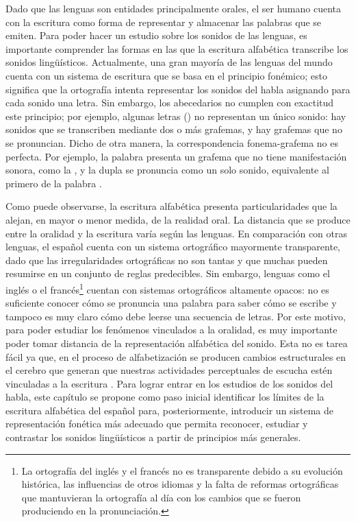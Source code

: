 Dado que las lenguas son entidades principalmente orales, el ser humano cuenta
con la escritura como forma de representar y almacenar las palabras que se
emiten. Para poder hacer un estudio sobre los sonidos de las lenguas, es
importante comprender las formas en las que la escritura alfabética transcribe
los sonidos lingüísticos. Actualmente, una gran mayoría de las lenguas del
mundo cuenta con un sistema de escritura que se basa en el principio fonémico;
esto significa que la ortografía intenta representar los sonidos del habla
asignando para cada sonido una letra. Sin embargo, los abecedarios no cumplen
con exactitud este principio; por ejemplo, algunas letras ()
no representan un único sonido: hay sonidos que se transcriben mediante dos o
más grafemas, y hay grafemas que no se pronuncian. Dicho de otra manera, la
correspondencia fonema-grafema no es perfecta. Por ejemplo, la palabra
 presenta un grafema que no tiene manifestación sonora, como la
, y la dupla  se pronuncia como un solo sonido, equivalente
al primero de la palabra .

Como puede observarse, la escritura alfabética presenta particularidades que la
alejan, en mayor o menor medida, de la realidad oral. La distancia que se
produce entre la oralidad y la escritura varía según las lenguas. En comparación
con otras lenguas, el español cuenta con un sistema ortográfico mayormente
transparente, dado que las irregularidades ortográficas no son tantas y que
muchas pueden resumirse en un conjunto de reglas predecibles. Sin embargo,
lenguas como el inglés o el francés\footnote{La ortografía del inglés y el
francés no es transparente debido a su evolución histórica, las influencias de
otros idiomas y la falta de reformas ortográficas que mantuvieran la ortografía
al día con los cambios que se fueron produciendo en la pronunciación.} cuentan
con sistemas ortográficos altamente opacos: no es suficiente conocer cómo se
pronuncia una palabra para saber cómo se escribe y tampoco es muy claro cómo
debe leerse una secuencia de letras. Por este motivo, para poder estudiar los
fenómenos vinculados a la oralidad, es muy importante poder tomar distancia de
la representación alfabética del sonido. Esta no es tarea fácil ya que, en el
proceso de alfabetización se producen cambios estructurales en el cerebro que
generan que nuestras actividades perceptuales de escucha estén vinculadas a la
escritura \parencite[253]{dehaene2014}. Para lograr entrar en los estudios de
los sonidos del habla, este capítulo se propone como paso inicial identificar
los límites de la escritura alfabética del español para, posteriormente,
introducir un sistema de representación fonética más adecuado que permita
reconocer, estudiar y contrastar los sonidos lingüísticos a partir de
principios más generales.

